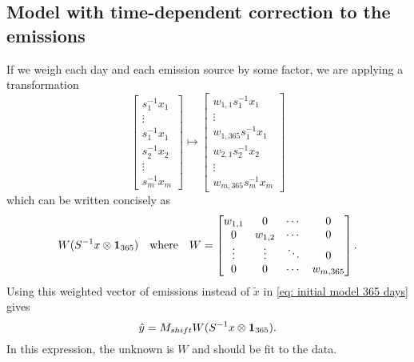 \documentclass{article}
\begin{document}
\subsection{Model with time-dependent correction to the emissions}
If we weigh each day and each emission source by some factor, we are applying a transformation
$$
\begin{bmatrix}
    s_1^{-1} x_1 \\
    \vdots \\
    s_1^{-1} x_1 \\ 
    s_2^{-1} x_2 \\
    \vdots \\ 
    s_m^{-1} x_m
\end{bmatrix}
\mapsto
\begin{bmatrix}
    w_{1,1} s_1^{-1} x_1 \\
    \vdots \\
    w_{1,365} s_1^{-1} x_1 \\ 
    w_{2,1} s_2^{-1} x_2 \\
    \vdots \\ 
    w_{m, 365} s_m^{-1} x_m
\end{bmatrix}
$$
which can be written concisely as 
$$
W (S^{-1} x \otimes \vb{1}_{365})
\quad\text{where}\quad 
W = \begin{bmatrix}
    w_{1,1} & 0 & \cdots & 0 \\
    0 & w_{1,2} & \cdots & 0 \\
    \vdots & \vdots & \ddots & 0 \\
    0 & 0 & \cdots & w_{m, 365}
\end{bmatrix}
.$$
Using this weighted vector of emissions instead of $\tilde{x}$ in \cref{eq: initial model 365 days} gives
\begin{equation}
    \label{eq: time-evolving model concise}
\hat{y} = M_{shift} W (S^{-1} x \otimes \vb{1}_{365})
.\end{equation}
In this expression, the unknown is $W$ and should be fit to the data. 

\end{document}
